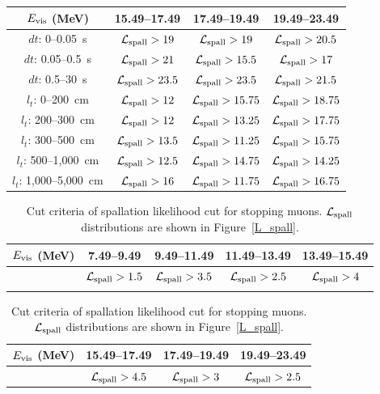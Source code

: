\begin{table}[p]
\begin{tabular}{cccc}
		$E_{\rm vis}$ (MeV)      & 15.49--17.49                     & 17.49--19.49                      & 19.49--23.49                      \\ \hline
		$dt$: 0--0.05~s          & $\mathcal{L}_{\rm spall} > 19$   & $\mathcal{L}_{\rm spall} > 19$    & $\mathcal{L}_{\rm spall} > 20.5$  \\
		$dt$: 0.05--0.5~s        & $\mathcal{L}_{\rm spall} > 21$   & $\mathcal{L}_{\rm spall} > 15.5$  & $\mathcal{L}_{\rm spall} > 17$    \\
		$dt$: 0.5--30~s          & $\mathcal{L}_{\rm spall} > 23.5$ & $\mathcal{L}_{\rm spall} > 23.5$  & $\mathcal{L}_{\rm spall} > 21.5$  \\
		$l_{t}$: 0--200~cm       & $\mathcal{L}_{\rm spall} > 12$   & $\mathcal{L}_{\rm spall} > 15.75$ & $\mathcal{L}_{\rm spall} > 18.75$ \\
		$l_{t}$: 200--300~cm     & $\mathcal{L}_{\rm spall} > 12$   & $\mathcal{L}_{\rm spall} > 13.25$ & $\mathcal{L}_{\rm spall} > 17.75$ \\
		$l_{t}$: 300--500~cm     & $\mathcal{L}_{\rm spall} > 13.5$ & $\mathcal{L}_{\rm spall} > 11.25$ & $\mathcal{L}_{\rm spall} > 15.75$ \\
		$l_{t}$: 500--1,000~cm   & $\mathcal{L}_{\rm spall} > 12.5$ & $\mathcal{L}_{\rm spall} > 14.75$ & $\mathcal{L}_{\rm spall} > 14.25$ \\
		$l_{t}$: 1,000--5,000~cm & $\mathcal{L}_{\rm spall} > 16$   & $\mathcal{L}_{\rm spall} > 11.75$ & $\mathcal{L}_{\rm spall} > 16.75$ \\ \hline \hline
	\end{tabular}
\end{table}

\begin{table}[p]
	\centering
	\caption[Cut criteria of spallation likelihood cut for stopping muons]{
	Cut criteria of spallation likelihood cut for stopping muons.
	$\mathcal{L}_{\rm spall}$ distributions are shown in Figure~\ref{L_spall}.
	}\label{tab:cut_stopping}
	\vs
	\begin{tabular}{ccccc} \hline \hline
		$E_{\rm vis}$ (MeV) & 7.49--9.49                      & 9.49--11.49                     & 11.49--13.49                    & 13.49--15.49                  \\ \hline
		                    & $\mathcal{L}_{\rm spall} > 1.5$ & $\mathcal{L}_{\rm spall} > 3.5$ & $\mathcal{L}_{\rm spall} > 2.5$ & $\mathcal{L}_{\rm spall} > 4$ \\ \hline \hline
		                    &                                 &                                 &                                 &
	\end{tabular}
	\begin{tabular}{cccc} \hline \hline
		$E_{\rm vis}$ (MeV) & 15.49--17.49                    & 17.49--19.49                  & 19.49--23.49                    \\ \hline
		                    & $\mathcal{L}_{\rm spall} > 4.5$ & $\mathcal{L}_{\rm spall} > 3$ & $\mathcal{L}_{\rm spall} > 2.5$ \\ \hline \hline
	\end{tabular}
\end{table}

